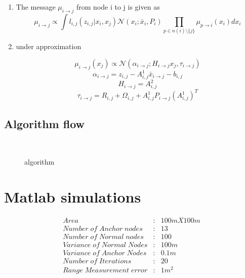 \documentclass[12pt]{article}
\begin{document}
\begin{enumerate}
\begin{enumerate}
 \item  The message $ \mu_{i \rightarrow j}$ from node i to j is given as
  \begin{equation}
\mu_{i \rightarrow j} \propto \int l_{i,j}(z_{i,j}|x_{i},x_{j})\mathcal{N} (x_{ i };\bar{x}_{ i },P_{i})\prod_{p \in n(i)\setminus \{ j \} } \mu_{p\rightarrow i}(x_{i}) dx_{i}
\end{equation}
\item under approximation

\begin{equation}
   \mu_{i \rightarrow j}(x_{j}) \propto \mathcal{N} (\alpha_{i \rightarrow j};H_{i \rightarrow j}x_{j},\tau_{i \rightarrow j})
\end{equation}
 \begin{equation}
   \alpha_{i \rightarrow j}=z_{i,j}-A^{1}_{i,j}\bar{x}_{i \rightarrow j}-b_{i,j}
\end{equation} 
 \begin{equation}
 H_{i \rightarrow j}=A^{2}_{i,j}
\end{equation}
 \begin{equation}
 \tau_{i \rightarrow j}=R_{i,j}+\Omega_{i,j}+A^{1}_{i,j}P_{i \rightarrow j}(A^{1}_{i,j})^{T}
\end{equation} 

\end{enumerate}

\end{enumerate}
\pagebreak
\subsection{Algorithm flow}
\begin{figure}[h]


\centering
{}\\

\caption{ algorithm }
\label{carrdh}
\end{figure}

\section{Matlab simulations}

\begin{align*}
  Area		&	:&  100 m X 100 m\\
Number\;of\; Anchor\; nodes	&	:&   13\\
Number\; of\; Normal \;nodes      	&	:&   100\\
Variance\; of\; Normal\; Nodes	&	:&  100 m\\
Variance\; of\; Anchor\; Nodes	&	:& 0.1 m\\
Number \;of\; Iterations 		&	:&  20\\
Range\; Measurement\; error           &	:&  1 m^2 
\end{align*}
\end{document}
